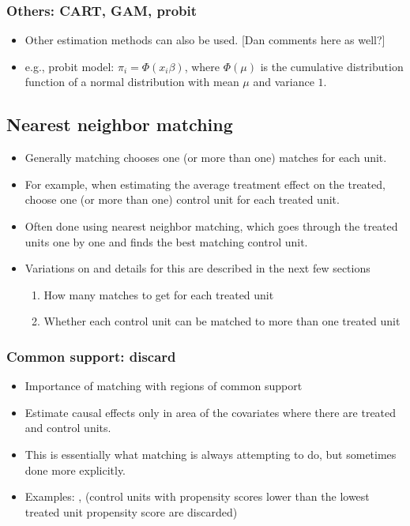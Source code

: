 \documentclass[11pt,titlepage]{article}
\begin{document}
\subsubsection{Others: CART, GAM, probit}
\begin{itemize}
\item Other estimation methods can also be used.  [Dan comments here as well?]
\item e.g., probit model: $\pi_i = \Phi(x_i \beta)$, where $\Phi(\mu)$ is the cumulative distribution function of a normal distribution with mean $\mu$ and variance $1$.
\end{itemize}

\subsection{Nearest neighbor matching}
\label{nearest}
\begin{itemize}
\item Generally matching chooses one (or more than one) matches for each unit.  
\item For example, when estimating the average treatment effect on the treated, choose one (or more than one) control unit for each treated unit. 
\item Often done using nearest neighbor matching, which goes through the treated units one by one and finds the best matching control unit. 
\item Variations on and details for this are described in the next few sections
\begin{enumerate} \item  How many matches to get for each treated unit
		  \item  Whether each control unit can be matched to more than one treated unit
\end{enumerate}
\end{itemize}

\subsubsection{Common support: discard}
\begin{itemize}
\item Importance of matching with regions of common support
\item Estimate causal effects only in area of the covariates where there are treated and control units.  
\item This is essentially what matching is always attempting to do, but sometimes done more explicitly.
\item Examples: \cite{KinZen02}, \cite{DehWah99} (control units with propensity 
scores lower than the lowest treated unit propensity score are discarded)
\end{itemize} 
\end{document}
